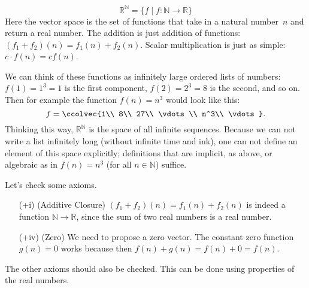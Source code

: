 \begin{example}
\[ \mathbb{R}^{\mathbb{N}} = \{f \mid f \colon \mathbb{N} \rightarrow \mathbb{R} \} \]
Here the vector space is the set of functions that take in a natural number~$n$ and return a real number.  The addition is just addition of functions: $(f_1 + f_2)(n) = f_1(n) + f_2(n)$.  Scalar multiplication is just as simple: $c \cdot f(n) = cf(n)$.



We can think of these functions as infinitely large ordered lists of numbers: \(f(1)=1^3=1\) is the first component, \(f(2)=2^3=8\) is the second, and so on. Then for example the function \(f(n)=n^3\) would look like this:
\[
f=\ccolvec{1\\ 8\\ 27\\ \vdots\\ n^3\\ \vdots }.
\]
Thinking this way, \(\mathbb{R}^{\mathbb{N}}\) is the space of all infinite sequences. 
Because we can not write a list infinitely long (without infinite time and ink), one can not define an element of this space explicitly; definitions that are implicit, as above, or algebraic as in $f(n)=n^3$ (for all $n \in \mathbb{N}$) suffice.

Let's check some axioms.

\begin{itemize}
\item[(+i)] (Additive Closure) $(f_1 + f_2)(n)=f_1(n) +f_2(n)$ is indeed a function 
$\mathbb{N} \rightarrow \mathbb{R}$, since the sum of two real numbers is a real number.

\item[(+iv)] (Zero) We need to propose a zero vector.  The constant zero function $g(n) = 0$ works because then $f(n) + g(n) = f(n) + 0 = f(n)$.
\end{itemize}
The other axioms should also be checked.  This can be done using  properties of the real numbers.
\end{example}

